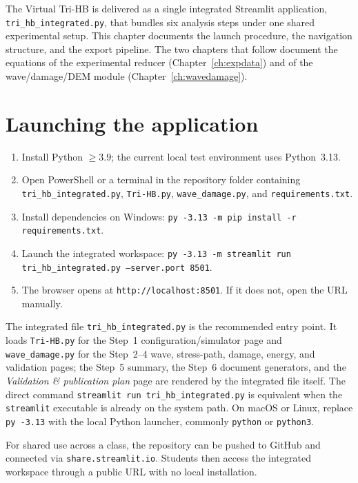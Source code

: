 \documentclass[11pt,a4paper,openany]{book}
\theoremstyle{handbook}
\begin{document}
The Virtual Tri-HB is delivered as a single integrated Streamlit
application, \texttt{tri\_hb\_integrated.py}, that bundles six analysis
steps under one shared experimental setup. This chapter documents the
launch procedure, the navigation structure, and the export pipeline. The
two chapters that follow document the equations of the experimental
reducer (Chapter~\ref{ch:expdata}) and of the wave/damage/DEM module
(Chapter~\ref{ch:wavedamage}).

\section{Launching the application}

\begin{stepbox}
\begin{enumerate}[leftmargin=*,itemsep=3pt]
  \item Install Python $\ge 3.9$; the current local test environment uses
        Python~3.13.
  \item Open PowerShell or a terminal in the repository folder containing
        \texttt{tri\_hb\_integrated.py}, \texttt{Tri-HB.py},
        \texttt{wave\_damage.py}, and \texttt{requirements.txt}.
  \item Install dependencies on Windows:
        \texttt{py -3.13 -m pip install -r requirements.txt}.
  \item Launch the integrated workspace:
        \texttt{py -3.13 -m streamlit run tri\_hb\_integrated.py --server.port 8501}.
  \item The browser opens at \texttt{http://localhost:8501}. If it does
        not, open the URL manually.
\end{enumerate}
\end{stepbox}

\noindent The integrated file \texttt{tri\_hb\_integrated.py} is the
recommended entry point. It loads \texttt{Tri-HB.py} for the Step~1
configuration/simulator page and \texttt{wave\_damage.py} for the Step~2--4
wave, stress-path, damage, energy, and validation pages; the Step~5 summary,
the Step~6 document generators, and the \emph{Validation \& publication plan}
page are rendered by the integrated file itself. The direct command
\texttt{streamlit run tri\_hb\_integrated.py} is equivalent when the
\texttt{streamlit} executable is already on the system path. On macOS or
Linux, replace \texttt{py -3.13} with the local Python launcher, commonly
\texttt{python} or \texttt{python3}.

For shared use across a class, the repository can be pushed to GitHub and
connected via \texttt{share.streamlit.io}. Students then access the
integrated workspace through a public URL with no local installation.
\end{document}
